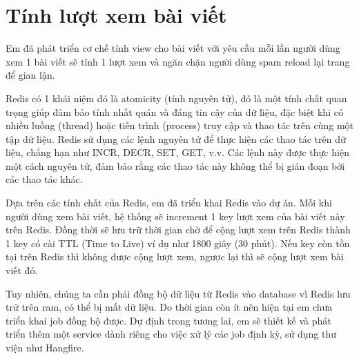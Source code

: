 \documentclass[../index.tex]{subfiles}
\begin{document}
    
    \section{Tính lượt xem bài viết}
    Em đã phát triển cơ chế tính view cho bài viết với yêu cầu mỗi lần người dùng xem 1 bài viết sẽ tính 1 lượt xem và ngăn chặn người dùng spam reload lại trang để gian lận.
    
    Redis có 1 khái niệm đó là atomicity (tính nguyên tử), đó là một tính chất quan trọng giúp đảm bảo tính nhất quán và đáng tin cậy của dữ liệu, đặc biệt khi có nhiều luồng (thread) hoặc tiến trình (process) truy cập và thao tác trên cùng một tập dữ liệu. Redis sử dụng các lệnh nguyên tử để thực hiện các thao tác trên dữ liệu, chẳng hạn như INCR, DECR, SET, GET, v.v. Các lệnh này được thực hiện một cách nguyên tử, đảm bảo rằng các thao tác này không thể bị gián đoạn bởi các thao tác khác.
    
    Dựa trên các tính chất của Redis, em đã triển khai Redis vào dự án. Mỗi khi người dùng xem bài viết, hệ thống sẽ increment 1 key lượt xem của bài viết này trên Redis. Đồng thời sẽ lưu trữ thời gian chờ để cộng lượt xem trên Redis thành 1 key có cài TTL (Time to Live) ví dụ như 1800 giây (30 phút). Nếu key còn tồn tại trên Redis thì không được cộng lượt xem, ngược lại thì sẽ cộng lượt xem bài viết đó.

    Tuy nhiên, chúng ta cần phải đồng bộ dữ liệu từ Redis vào database vì Redis lưu trữ trên ram, có thể bị mất dữ liệu. Do thời gian còn ít nên hiện tại em chưa triển khai job đồng bộ được. Dự định trong tương lai, em sẽ thiết kế và phát triển thêm một service dành riêng cho việc xử lý các job định kỳ, sử dụng thư viện như Hangfire.
\end{document}
